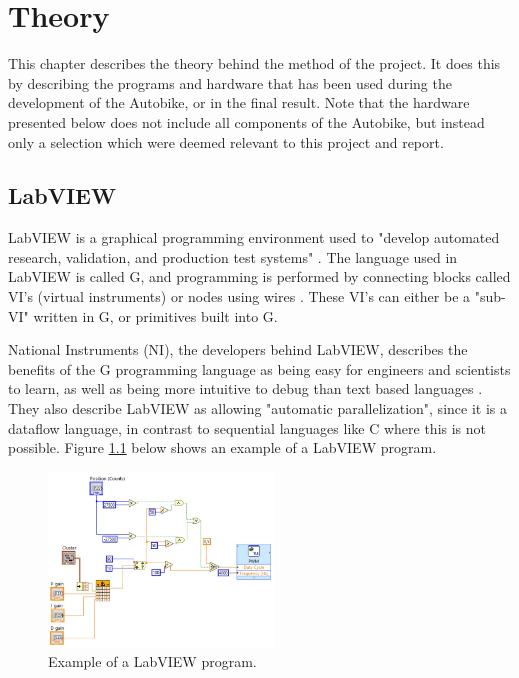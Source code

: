 \chapter{Theory}

This chapter describes the theory behind the method of the project. It does this by describing the programs and hardware that has been used during the development of the Autobike, or in the final result. Note that the hardware presented below does not include all components of the Autobike, but instead only a selection which were deemed relevant to this project and report.

\section{LabVIEW}
LabVIEW is a graphical programming environment used to "develop automated research, validation, and production test systems" \cite{NationalInstruments2022WhatLabVIEW}. The language used in LabVIEW is called G, and programming is performed by connecting blocks called VI's (virtual instruments) or nodes using wires \cite{Andrade1998SoftwareTM}. These VI's can either be a "sub-VI" written in G, or primitives built into G. 

National Instruments (NI), the developers behind LabVIEW, describes the benefits of the G programming language as being easy for engineers and scientists to learn, as well as being more intuitive to debug than text based languages \cite{NationalInstruments2022BenefitsLabVIEW}. They also describe LabVIEW as allowing "automatic parallelization", since it is a dataflow language, in contrast to sequential languages like C where this is not possible. Figure \ref{fig:lab-example} below shows an example of a LabVIEW program.

\begin{figure}[H]
    \centering
    \includegraphics[width=6cm]{figure/labview_example.jpg}
    \caption{Example of a LabVIEW program.}
    \label{fig:lab-example}
\end{figure}

